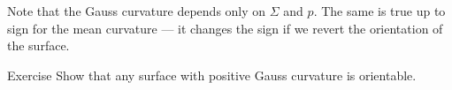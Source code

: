 Note that the Gauss curvature depends only on $\Sigma$ and $p$.
The same is true up to sign for the mean curvature --- it changes the sign if we revert the orientation of the surface.

\begin{thm}{Exercise}\label{ex:gauss+orientable}
Show that any surface with positive Gauss curvature is orientable. 
\end{thm}




